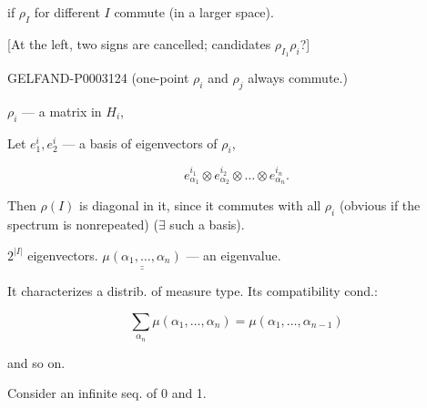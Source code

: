 if $\rho_I$ for different $I$ commute (in a larger space).

[At the left, two signs are cancelled; candidates $\rho_{I_1}\rho_i$?]

\begin{GelfandAdjacentEvidence}{GELFAND-P000312}{4}
(one-point $\rho_i$ and $\rho_j$ always commute.)

\end{GelfandAdjacentEvidence}




\hfill{}

$\rho_i$ --- a matrix in $H_i$,

Let $e_1^i, e_2^i$ --- a basis of eigenvectors of $\rho_i$,

\begin{equation*}e_{\alpha_1}^{i_1}\otimes e_{\alpha_2}^{i_2}\otimes\ldots\otimes e_{\alpha_n}^{i_n}.\end{equation*}

Then $\rho (I)$ is diagonal in it, since it commutes with all $\rho_i$ (obvious if the spectrum is nonrepeated) ($\exists$ such a basis).

$2^{|I|}$ eigenvectors. $\underline{\underline{\mu (\alpha_1,\ldots,\alpha_n)}}$ --- an eigenvalue.





It characterizes a distrib. of measure type. Its compatibility cond.:

\begin{equation*}\sum_{\alpha_n}\mu (\alpha_1,\ldots,\alpha_n)=\mu (\alpha_1,\ldots,\alpha_{n-1})\end{equation*}

and so on.

Consider an infinite seq. of 0 and 1.


